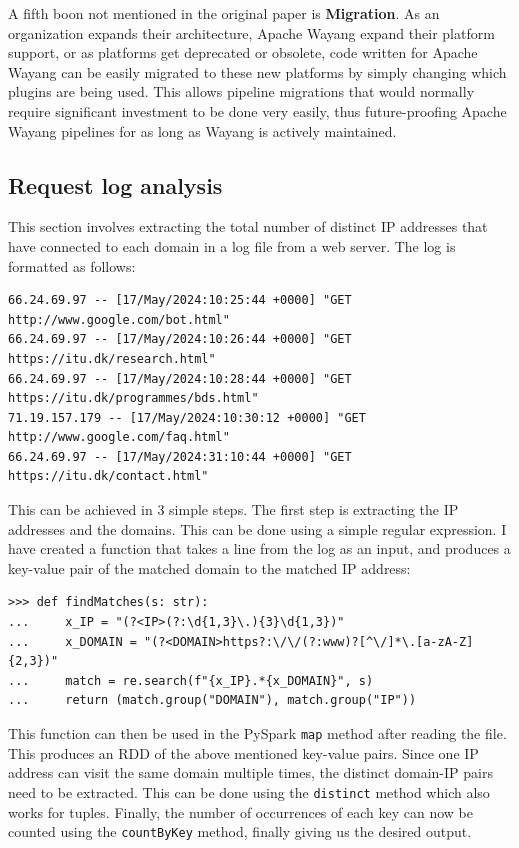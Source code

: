 A fifth boon not mentioned in the original paper is \textbf{Migration}. As an organization expands their architecture, Apache Wayang expand their platform support, or as platforms get deprecated or obsolete, code written for Apache Wayang can be easily migrated to these new platforms by simply changing which plugins are being used. This allows pipeline migrations that would normally require significant investment to be done very easily, thus future-proofing Apache Wayang pipelines for as long as Wayang is actively maintained.

\subsection{Request log analysis}

This section involves extracting the total number of distinct IP addresses that have connected to each domain in a log file from a web server. The log is formatted as follows:

\begin{small}
\begin{verbatim}
66.24.69.97 -- [17/May/2024:10:25:44 +0000] "GET http://www.google.com/bot.html"
66.24.69.97 -- [17/May/2024:10:26:44 +0000] "GET https://itu.dk/research.html"
66.24.69.97 -- [17/May/2024:10:28:44 +0000] "GET https://itu.dk/programmes/bds.html"
71.19.157.179 -- [17/May/2024:10:30:12 +0000] "GET http://www.google.com/faq.html"
66.24.69.97 -- [17/May/2024:31:10:44 +0000] "GET https://itu.dk/contact.html"
\end{verbatim}
\end{small}

This can be achieved in 3 simple steps. The first step is extracting the IP addresses and the domains. This can be done using a simple regular expression. I have created a function that takes a line from the log as an input, and produces a key-value pair of the matched domain to the matched IP address:

\begin{verbatim}
>>> def findMatches(s: str):
...     x_IP = "(?<IP>(?:\d{1,3}\.){3}\d{1,3})"
...     x_DOMAIN = "(?<DOMAIN>https?:\/\/(?:www)?[^\/]*\.[a-zA-Z]{2,3})"
...     match = re.search(f"{x_IP}.*{x_DOMAIN}", s)
...     return (match.group("DOMAIN"), match.group("IP"))
\end{verbatim}

This function can then be used in the PySpark \texttt{map} method after reading the file. This produces an RDD of the above mentioned key-value pairs. Since one IP address can visit the same domain multiple times, the distinct domain-IP pairs need to be extracted. This can be done using the \texttt{distinct} method which also works for tuples. Finally, the number of occurrences of each key can now be counted using the \texttt{countByKey} method, finally giving us the desired output.


